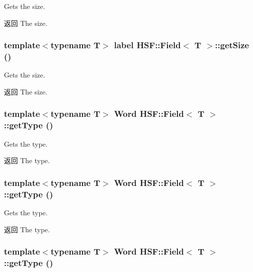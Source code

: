 Gets the size. \begin{DoxyReturn}{返回}
The size. 
\end{DoxyReturn}
\hypertarget{classHSF_1_1Field_aad566df51a130e83b42ae93ea2958eb1}{
\subsubsection[{getSize}]{\setlength{\rightskip}{0pt plus 5cm}template$<$typename T$>$ label {\bf HSF::Field}$<$ T $>$::getSize ()}}
\label{classHSF_1_1Field_aad566df51a130e83b42ae93ea2958eb1}


Gets the size. \begin{DoxyReturn}{返回}
The size. 
\end{DoxyReturn}
\hypertarget{classHSF_1_1Field_a43dc37894e37f158679ad2af096e8339}{
\subsubsection[{getType}]{\setlength{\rightskip}{0pt plus 5cm}template$<$typename T$>$ Word {\bf HSF::Field}$<$ T $>$::getType ()}}
\label{classHSF_1_1Field_a43dc37894e37f158679ad2af096e8339}


Gets the type. \begin{DoxyReturn}{返回}
The type. 
\end{DoxyReturn}
\hypertarget{classHSF_1_1Field_a43dc37894e37f158679ad2af096e8339}{
\subsubsection[{getType}]{\setlength{\rightskip}{0pt plus 5cm}template$<$typename T$>$ Word {\bf HSF::Field}$<$ T $>$::getType ()}}
\label{classHSF_1_1Field_a43dc37894e37f158679ad2af096e8339}


Gets the type. \begin{DoxyReturn}{返回}
The type. 
\end{DoxyReturn}
\hypertarget{classHSF_1_1Field_a43dc37894e37f158679ad2af096e8339}{
\subsubsection[{getType}]{\setlength{\rightskip}{0pt plus 5cm}template$<$typename T$>$ Word {\bf HSF::Field}$<$ T $>$::getType ()}}
\label{classHSF_1_1Field_a43dc37894e37f158679ad2af096e8339}


